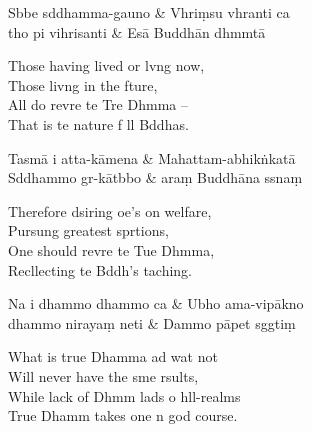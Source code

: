 \begin{twochants}
  Sbbe sddhamma-gauno & Vhriṃsu vhranti ca \\
  tho pi vihrisanti & Esā Buddhān dhmmtā \\
\end{twochants}

\begin{english}
  Those having lived or lvng now,\\
  Those livng in the fture,\\
  All do revre te Tre Dhmma --\\
  That is te nature f ll Bddhas.
\end{english}

\begin{twochants}
  Tasmā i atta-kāmena & Mahattam-abhikṅkatā \\
  Sddhammo gr-kātbbo & araṃ Buddhāna ssnaṃ \\
\end{twochants}

\begin{english}
  Therefore dsiring oe's on welfare,\\
  Pursung greatest sprtions,\\
  One should revre te Tue Dhmma,\\
  Recllecting te Bddh's taching.
\end{english}

\begin{twochants}
  Na i dhammo dhammo ca & Ubho ama-vipākno \\
  dhammo nirayaṃ neti & Dammo pāpet sggtiṃ \\
\end{twochants}

\begin{english}
  What is true Dhamma ad wat not\\
  Will never have the sme rsults,\\
  While lack of Dhmm lads o hll-realms\\
  True Dhamm takes one n  god course.
\end{english}

